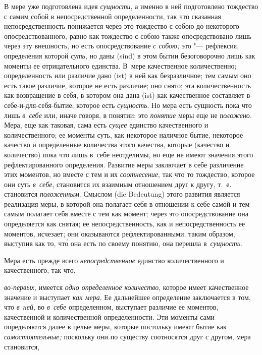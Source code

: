 В мере уже подготовлена идея {\em сущности}, а именно в ней подготовлено
тождество с самим собой в непосредственной определенности, так что сказанная
непосредственность понижается через это тождество с собою до некоторого
опосредствованного, равно как тождество с собою также опосредствовано лишь
через эту внешность, но есть опосредствование {\em с собою;} это "---
рефлексия, определения которой {\em суть}, но даны (sind) в этом бытии
безоговорочно лишь как моменты ее отрицательного единства. В~мере качественное
количественно; определенность или различие дано (ist) в ней как безразличное;
тем самым оно есть такое различие, которое не есть различие; оно снято; эта
количественность как возвращение в себя, в котором она дана (ist) как
качественное составляет в-себе-и-для-себя-бытие, которое есть {\em сущность}.
Но мера есть сущность пока что лишь {\em в~себе} или, иначе говоря, в понятии;
это {\em понятие} меры еще не {\em положено}. Мера, еще как таковая, сама есть
{\em сущее} единство качественного и количественного; ее моменты суть, как
некоторое наличное бытие, некоторое качество и определенные количества этого
качества, которые (качество и количество) пока что лишь в~себе неотделимы, но
еще не имеют значения этого рефлектированного определения. Развитие меры
заключает в себе различение этих моментов, но вместе с тем и их
{\em соотнесение}, так что то тождество, которое они суть {\em в~себе},
становится их взаимным отношением друг к другу, т.~е. становится
{\em положенным}. Смыслом (die Bedeutung) этого развития является реализация
меры, в которой она полагает себя в отношении к себе самой и тем самым полагает
себя вместе с тем как момент; через это опосредствование она определяется как
снятая; ее непосредственность, как и непосредственность ее моментов, исчезает;
они оказываются рефлектированными; таким образом, выступив как то, чт\'{о} она
есть по своему понятию, она перешла в~{\em сущность}.

Мера есть прежде всего {\em непосредственное} единство количественного
и качественного, так что,

{\em во-первых}, имеется {\em одно определенное количество}, которое имеет
качественное значение и выступает {\em как мера}. Ее дальнейшее определение
заключается в том, что {\em в~ней}, во {\em в~себе} определенном, выступает
различие ее моментов, качественной и количественной определенности. Эти моменты
сами определяются далее в целые меры, которые постольку имеют бытие как
{\em самостоятельные;} поскольку они по существу соотносятся друг с другом,
мера становится,

